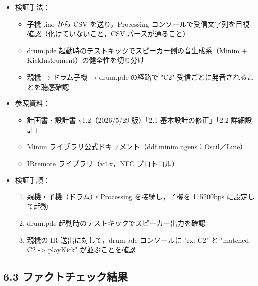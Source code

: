 \documentclass[a4paper,11pt]{ltjsarticle}
\providecommand{\％}{\%}
\begin{document}
\begin{itemize}
    \item 検証手法：
    \begin{itemize}
        \item 子機 .ino から CSV を送り，Processing コンソールで受信文字列を目視確認（化けていないこと，CSV パースが通ること）
        \item drum.pde 起動時のテストキックでスピーカー側の音生成系（Minim + KickInstrument）の健全性を切り分け
        \item 親機 → ドラム子機 → drum.pde の経路で "C2" 受信ごとに発音されることを聴感確認
    \end{itemize}
    \item 参照資料：
    \begin{itemize}
        \item 計画書・設計書 v1.2（2026/5/29 版）「2.1 基本設計の修正」「2.2 詳細設計」
        \item Minim ライブラリ公式ドキュメント（ddf.minim.ugens：Oscil／Line）
        \item IRremote ライブラリ（v4.x，NEC プロトコル）
    \end{itemize}
    \item 検証手順：
    \begin{enumerate}
        \item 親機・子機（ドラム）・Processing を接続し，子機を 115200bps に設定して起動
        \item drum.pde 起動時のテストキックでスピーカー出力を確認
        \item 親機の IR 送出に対して，drum.pde コンソールに "rx: C2" と "matched C2 -> playKick" が並ぶことを確認
    \end{enumerate}
\end{itemize}

\subsection*{6.3 ファクトチェック結果}
\end{document}

